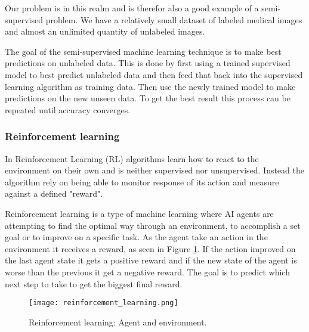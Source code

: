 \documentclass[thesis.tex]{subfiles}
\begin{document}
Our problem is in this realm and is therefor also a good example of a semi-supervised problem. We have a relatively small dataset of labeled medical images and almost an unlimited quantity of unlabeled images.

The goal of the semi-supervised machine learning technique is to make best predictions on unlabeled data. This is done by first using a trained supervised model to best predict unlabeled data and then feed that back into the supervised learning algorithm as training data. Then use the newly trained model to make predictions on the new unseen data. To get the best result this process can be repeated until accuracy converges.



\subsubsection{Reinforcement learning} \label{sec:reinforcement learning}
In Reinforcement Learning (RL) algorithms learn how to react to the environment on their own and is neither supervised nor unsupervised. Instead the algorithm rely on being able to monitor response of its action and measure against a defined "reward".

Reinforcement learning is a type of machine learning where AI agents are attempting to find the optimal way through an environment, to accomplish a set goal or to improve on a specific task. As the agent take an action in the environment it receives a reward, as seen in Figure \ref{fig:reinforcement_learning}. If the action improved on the last agent state it gets a positive reward and if the new state of the agent is worse than the previous it get a negative reward. The goal is to predict which next step to take to get the biggest final reward.

\begin{figure}[h] %
  \begin{center}
    \texttt{[image: reinforcement\_learning.png]}
    \caption[Reinforcement learning: Agent and environment.]{Reinforcement learning: Agent and environment.}
    \label{fig:reinforcement_learning}
  \end{center}
\end{figure}
\end{document}
